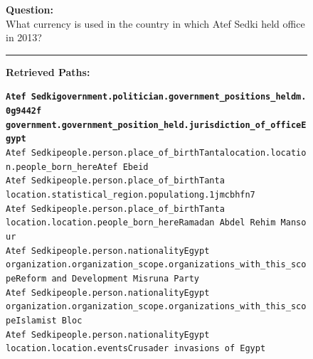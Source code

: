 \begin{figure}[t]
\begin{tcolorbox}[colback=gray!5!white,
                  colframe=gray!75!black,
                  title=CWQ-WebQTrn-105\_64489ea2de4b116070d33a0ebcfd4866]
\scriptsize

\textbf{Question:}\\
What currency is used in the country in which Atef Sedki held office in 2013?

\rule{\linewidth}{0.4pt}

\textbf{Retrieved Paths:}\\[2pt]
{\raggedright
\texttt{\textbf{Atef Sedki\patharrow government.politician.government\_positions\_held\patharrow m.0g9442f\patharrow \\ government.government\_position\_held.jurisdiction\_of\_office\patharrow Egypt}}\\[6pt]

\texttt{Atef Sedki\patharrow people.person.place\_of\_birth\patharrow Tanta\patharrow location.location.people\_born\_here\patharrow Atef Ebeid}\\[6pt]

\texttt{Atef Sedki\patharrow people.person.place\_of\_birth\patharrow Tanta\patharrow \\ location.statistical\_region.population\patharrow g.1jmcbhfn7}\\[6pt]

\texttt{Atef Sedki\patharrow people.person.place\_of\_birth\patharrow Tanta\patharrow \\ location.location.people\_born\_here\patharrow Ramadan Abdel Rehim Mansour}\\[6pt]

\texttt{Atef Sedki\patharrow people.person.nationality\patharrow Egypt\patharrow \\ organization.organization\_scope.organizations\_with\_this\_scope\patharrow Reform and Development Misruna Party}\\[6pt]

\texttt{Atef Sedki\patharrow people.person.nationality\patharrow Egypt\patharrow \\ organization.organization\_scope.organizations\_with\_this\_scope\patharrow Islamist Bloc}\\[6pt]

\texttt{Atef Sedki\patharrow people.person.nationality\patharrow Egypt\patharrow \\ location.location.events\patharrow Crusader invasions of Egypt}\\[6pt]

}
\end{tcolorbox}
\end{figure}
